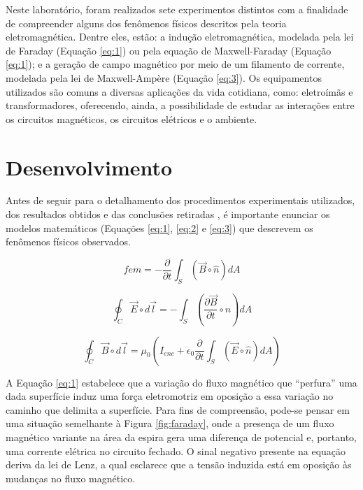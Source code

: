 \documentclass[12pt, a4paper, notitlepage]{article}
\begin{document}
        Neste laboratório, foram realizados sete experimentos distintos com a finalidade de compreender alguns dos fenômenos físicos descritos pela teoria eletromagnética. Dentre eles, estão: a indução eletromagnética, modelada pela lei de Faraday (Equação \ref{eq:1}) ou pela equação de Maxwell-Faraday (Equação \ref{eq:1}); e a geração de campo magnético por meio de um filamento de corrente, modelada pela lei de Maxwell-Ampère (Equação \ref{eq:3}). Os equipamentos utilizados são comuns a diversas aplicações da vida cotidiana, como: eletroímãs e transformadores, oferecendo, ainda, a possibilidade de estudar as interações entre os circuitos magnéticos, os circuitos elétricos e o ambiente.
        
        \section{Desenvolvimento}
        
        Antes de seguir para o detalhamento dos procedimentos experimentais utilizados, dos resultados obtidos e das conclusões retiradas , é importante enunciar os modelos matemáticos (Equações \ref{eq:1}, \ref{eq:2} e \ref{eq:3}) que descrevem os fenômenos físicos observados.

        \begin{equation}\label{eq:1}
            fem = -\frac{\partial}{\partial t}\int_{S}(\vec{B}\circ\hat{n})dA
        \end{equation}
        
        \begin{equation}\label{eq:2}
            \oint_{C}\vec{E}\circ d\vec{l} = -\int_{S}(\frac{\partial\vec{B}}{\partial t}\circ\hat{n})dA
        \end{equation}
        
        \begin{equation}\label{eq:3}
            \oint_{C}\vec{B}\circ d\vec{l} = \mu_0(I_{enc}+\epsilon_0\frac{\partial}{\partial t}\int_{S}(\vec{E}\circ\hat{n})dA)
        \end{equation}
        
        \vspace{0.25cm}
        
        A Equação \ref{eq:1} estabelece que a variação do fluxo magnético que ``perfura'' uma dada superfície induz uma força eletromotriz em oposição a essa variação no caminho que delimita a superfície. Para fins de compreensão, pode-se pensar em uma situação semelhante à Figura \ref{fig:faraday}, onde a presença de um fluxo magnético variante na área da espira gera uma diferença de potencial e, portanto, uma corrente elétrica no circuito fechado. O sinal negativo presente na equação deriva da lei de Lenz, a qual esclarece que a tensão induzida está em oposição às mudanças no fluxo magnético. 
        
\end{document}
